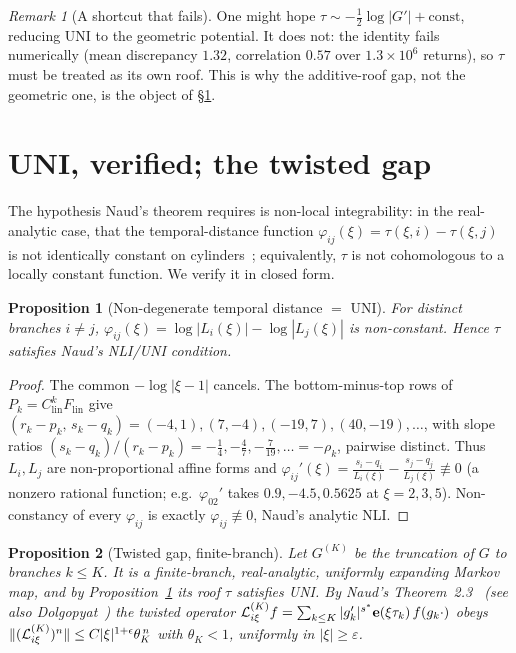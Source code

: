 \documentclass[11pt]{article}
\newtheorem{proposition}{Proposition}\newtheorem{corollary}{Corollary}
\theoremstyle{definition}\newtheorem{definition}{Definition}
\theoremstyle{remark}\newtheorem{remark}{Remark}
\begin{document}
\begin{remark}[A shortcut that fails]\label{r:shortcut}
One might hope $\tau\sim-\tfrac12\log|G'|+\text{const}$, reducing UNI to the
geometric potential. It does not: the identity fails numerically (mean
discrepancy $1.32$, correlation $0.57$ over $1.3\times10^6$ returns), so $\tau$
must be treated as its own roof. This is why the additive-roof gap, not the
geometric one, is the object of \S\ref{sec:uni}.
\end{remark}

\section{UNI, verified; the twisted gap}\label{sec:uni}
The hypothesis Naud's theorem requires is non-local integrability: in the
real-analytic case, that the temporal-distance function
$\varphi_{ij}(\xi)=\tau(\xi,i)-\tau(\xi,j)$ is not identically constant on
cylinders~\cite[Def.~2.1]{Naud2005}; equivalently, $\tau$ is not cohomologous to
a locally constant function. We verify it in closed form.

\begin{proposition}[Non-degenerate temporal distance $=$ UNI]\label{p:uni}
For distinct branches $i\ne j$, $\varphi_{ij}(\xi)=\log|L_i(\xi)|-\log|L_j(\xi)|$
is non-constant. Hence $\tau$ satisfies Naud's NLI/UNI condition.
\end{proposition}
\begin{proof}
The common $-\log|\xi-1|$ cancels. The bottom-minus-top rows of
$P_k=C_{\mathrm{lin}}^kF_{\mathrm{lin}}$ give
$(r_k-p_k,\,s_k-q_k)=(-4,1),(7,-4),(-19,7),(40,-19),\dots$, with slope ratios
$(s_k-q_k)/(r_k-p_k)=-\tfrac14,-\tfrac47,-\tfrac{7}{19},\dots=-\rho_k$, pairwise
distinct. Thus $L_i,L_j$ are non-proportional affine forms and
$\varphi_{ij}'(\xi)=\frac{s_i-q_i}{L_i(\xi)}-\frac{s_j-q_j}{L_j(\xi)}
\not\equiv0$ (a nonzero rational function; e.g.\ $\varphi_{02}'$ takes
$0.9,-4.5,0.5625$ at $\xi=2,3,5$). Non-constancy of every $\varphi_{ij}$ is
exactly $\varphi_{ij}\not\equiv0$, Naud's analytic NLI.
\end{proof}

\begin{proposition}[Twisted gap, finite-branch]\label{p:gap-finite}
Let $G^{(K)}$ be the truncation of $G$ to branches $k\le K$. It is a
finite-branch, real-analytic, uniformly expanding Markov map, and by
Proposition~\ref{p:uni} its roof $\tau$ satisfies UNI. By Naud's
Theorem~2.3~\cite{Naud2005} (see also
Dolgopyat~\cite{Dolgopyat1998,DolgopyatPrevalence1998}) the twisted operator
$\mathcal L^{(K)}_{i\xi}f=\sum_{k\le K}|g_k'|^{s^\ast}\mathbf e(\xi\tau_k)\,f(g_k\cdot)$ obeys
$\|(\mathcal L^{(K)}_{i\xi})^n\|\le C|\xi|^{1+\epsilon}\theta_K^{\,n}$ with $\theta_K<1$,
uniformly in $|\xi|\ge\varepsilon$.
\end{proposition}
\end{document}
